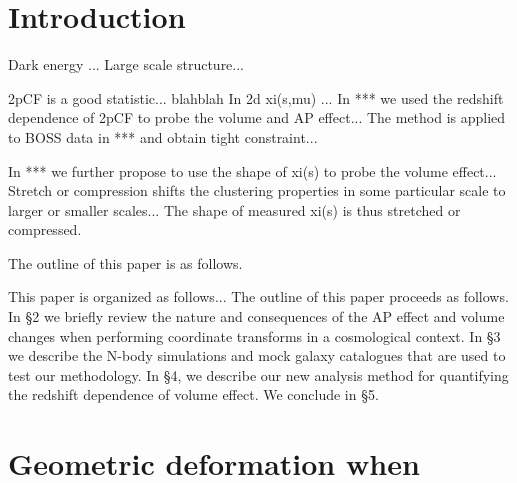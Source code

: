 \documentclass[iop]{emulateapj}
\begin{document}
\section{Introduction}

Dark energy ... Large scale structure...

2pCF is a good statistic... blahblah
In 2d xi(s,mu) ...
In *** we used the redshift dependence of 2pCF to probe the volume and AP effect...
The method is applied to BOSS data in *** and obtain tight constraint...

In *** we further propose to use the shape of xi(s) to probe the volume effect...
Stretch or compression shifts the clustering properties in some particular scale to larger or smaller scales...
The shape of measured xi(s) is thus stretched or compressed.

The outline of this paper is as follows. 

This paper is organized as follows...
The outline of this paper proceeds as follows. 
In \S 2 we briefly review the nature and consequences of the AP effect and volume changes when performing coordinate transforms in a cosmological context. 
In \S 3 we describe the N-body simulations and mock galaxy catalogues that are used to test our methodology.
In \S 4, we describe our new analysis method for quantifying the redshift dependence of volume effect.
We conclude in \S 5.


\section{Geometric deformation when }
\label{sec:Voleffect}
\end{document}
